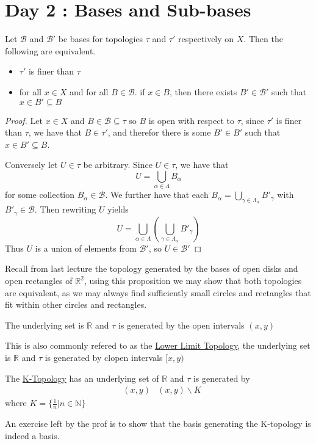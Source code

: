 \section{Day 2 : Bases and Sub-bases}
\begin{proposition}
    Let $\mathscr{B}$ and $\mathscr{B}'$ be bases for topologies $\tau$ and $\tau'$ respectively on $X$. Then the following are equivalent.
    \begin{itemize}
        \item $\tau'$ is finer than $\tau$
        \item for all $x\in X$ and for all $B\in\mathscr{B}$. if $x\in B$, then there exists $B'\in\mathscr{B}'$ such that $x\in B'\subseteq B$
    \end{itemize}
\end{proposition}
\begin{proof}
    Let $x\in X$ and $B\in\mathscr{B}\subseteq\tau$ so $B$ is open with respect to $\tau$, since $\tau'$ is finer than $\tau$, we have that $B\in\tau'$, and therefor there is some $B'\in B'$ such that $x\in B'\subseteq B$. 

Conversely let $U\in\tau$ be arbitrary. Since $U\in\tau$, we have that 
\[U=\bigcup_{\alpha\in\Lambda}B_\alpha\]
for some collection $B_\alpha\in\mathscr{B}$. We further have that each $B_\alpha=\bigcup_{\gamma\in\Lambda_\alpha}B'_\gamma$ with $B'_\gamma\in\mathscr{B}$. Then rewriting $U$ yields
\[U=\bigcup_{\alpha\in\Lambda}\left(\bigcup_{\gamma\in\Lambda_\alpha}B'_\gamma\right)\]
Thus $U$ is a union of elements from $\mathscr{B}'$, so $U\in\mathscr{B}'$
\end{proof}
Recall from last lecture the topology generated by the bases of open disks and open rectangles of $\mathbb{R}^2$, using this proposition we may show that both topologies are equivalent, as we may always find sufficiently small circles and rectangles that fit within other circles and rectangles.

\begin{example}
    The underlying set is $\mathbb{R}$ and $\tau$ is generated by the open intervals $(x,y)$
\end{example}
\begin{example}
    This is also commonly refered to as the \href{https://en.wikipedia.org/wiki/Lower_limit_topology}{Lower Limit Topology}, the underlying set is $\mathbb{R}$ and $\tau$ is generated by clopen intervals $[x,y)$
\end{example}
\begin{example}[K-Topology]
    The \href{https://en.wikipedia.org/wiki/K-topology}{K-Topology} has an underlying set of $\mathbb{R}$ and $\tau$ is generated by
    \begin{align*}
        &(x,y) &(x,y)\backslash K
    \end{align*}
    where $K=\{\frac{1}{n}\vert n\in\mathbb{N}\}$
\end{example}
An exercise left by the prof is to show that the basis generating the K-topology is indeed a basis.
